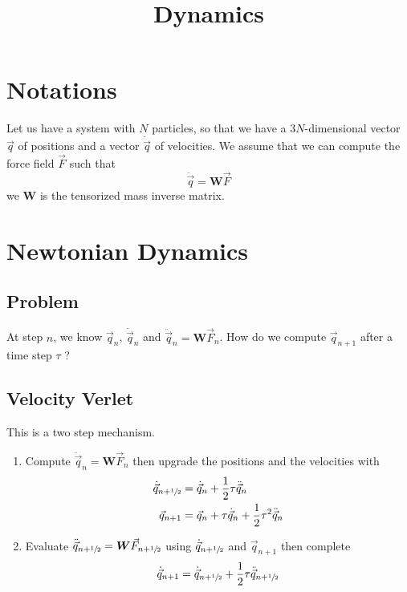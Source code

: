\documentclass[aps,twocolumn]{revtex4}
\newcommand{\mymat}[1]{\boldsymbol{#1}}
\newcommand{\half}{\sfrac{1}{2}}
\begin{document}
\title{Dynamics}

\section{Notations}
Let us have a system with $N$ particles, so that we have a $3N$-dimensional
vector $\vec{q}$ of positions and a vector $\dot{\vec{q}}$ of velocities.
We assume that we can compute the force field $\vec{F}$ such that
\begin{equation}
	\ddot{\vec{q}} = \mymat{W} \vec{F}
\end{equation}
we $\mymat{W}$ is the tensorized mass inverse matrix.

\section{Newtonian Dynamics}

\subsection{Problem}
At step $n$, we know $\vec{q}_n$, $\dot{\vec{q}}_n$ and $\ddot{\vec{q}}_n = \mymat{W} \vec{F}_n$.
How do we compute $\vec{q}_{n+1}$ after a time step $\tau$ ?

\subsection{Velocity Verlet}
This is a two step mechanism.
\begin{enumerate}
	\item
	Compute $\ddot{\vec{q}}_n = \mymat{W} \vec{F}_n$ then 
	upgrade the positions and the velocities with
	\begin{align}
	\dot{\vec{q}}_{n+\half} & = \dot{\vec{q}}_{n} + \dfrac{1}{2} \tau \ddot{\vec{q}}_n \\
	\vec{q}_{n+1}           & = \vec{q}_{n}       + \tau \dot{\vec{q}}_{n} + \dfrac{1}{2}{\tau^2} \ddot{\vec{q}}_n
\end{align}

	\item 
	Evaluate $\ddot{\vec{q}}_{n+\half} = \mymat{W} \vec{F}_{n+\half}$  using $\dot{\vec{q}}_{n+\half}$ and $\vec{q}_{n+1}$ 
	then complete
	\begin{equation}
		\dot{\vec{q}}_{n+1} = \dot{\vec{q}}_{n+\half} + \dfrac{1}{2} \tau \ddot{\vec{q}}_{n+\half}
	\end{equation}

\end{enumerate}
\end{document}
